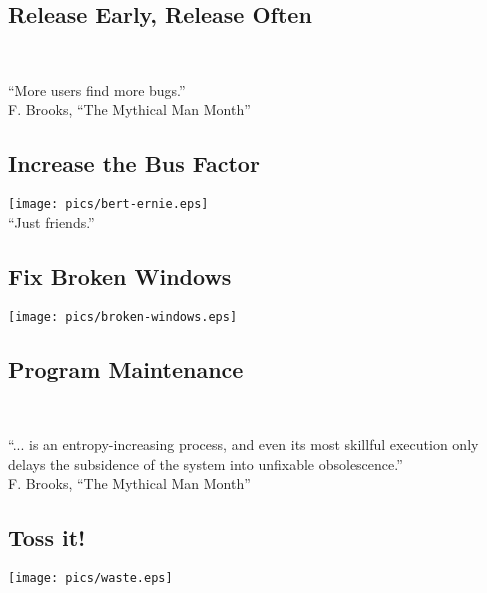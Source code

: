 \documentclass[xga]{xdvislides}
\begin{document}
\subsection{Release Early, Release Often}
\\
\Huge
\begin{center}
	``More users find more bugs.'' \\
	\addvspace{.2in}
	\small F. Brooks, ``The Mythical Man Month''
\end{center}
\Normalsize

\subsection{Increase the Bus Factor}
\vspace*{\fill}
\begin{center}
	\texttt{[image: pics/bert-ernie.eps]} \\
	\small
	``Just friends.''
\end{center}
\vspace*{\fill}

\subsection{Fix Broken Windows}
\vspace*{\fill}
\begin{center}
	\texttt{[image: pics/broken-windows.eps]}
\end{center}
\vspace*{\fill}

\subsection{Program Maintenance}
\\
\Huge
\begin{center}
	``... is an entropy-increasing process, and even its most skillful
	execution only delays the subsidence of the system into unfixable
	obsolescence.'' \\
	\addvspace{.2in}
	\small F. Brooks, ``The Mythical Man Month''
\end{center}
\Normalsize

\subsection{Toss it!}
\vspace*{\fill}
\begin{center}
	\texttt{[image: pics/waste.eps]}
\end{center}
\vspace*{\fill}
\end{document}
